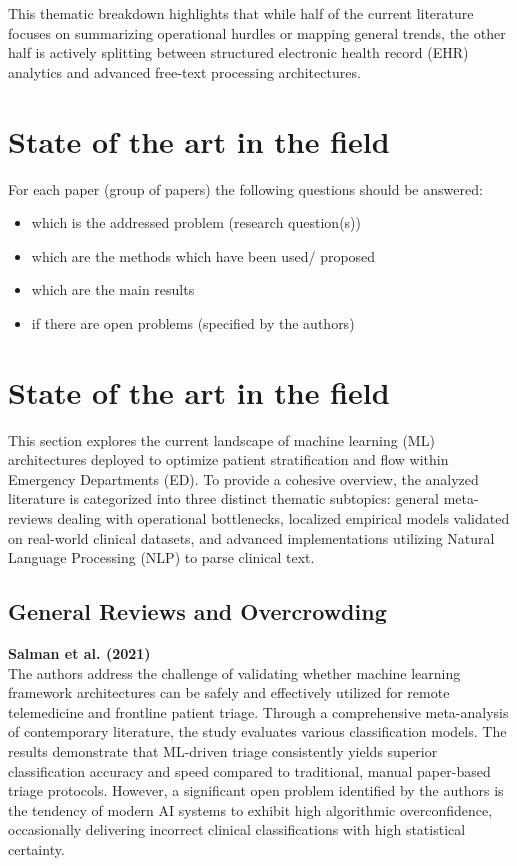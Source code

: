 \documentclass{article}
\begin{document}
This thematic breakdown highlights that while half of the current literature focuses on summarizing operational hurdles or mapping general trends, the other half is actively splitting between structured electronic health record (EHR) analytics and advanced free-text processing architectures.

\section{State of the art in the field}

For each paper (group of papers) the following questions should be answered:
\begin{itemize}
\item which is the addressed problem (research question(s))

\item which are the methods which have been used/ proposed 

\item which are the main results

\item if there are open problems (specified by the authors)
\end{itemize}

\section{State of the art in the field}

This section explores the current landscape of machine learning (ML) architectures deployed to optimize patient stratification and flow within Emergency Departments (ED). To provide a cohesive overview, the analyzed literature is categorized into three distinct thematic subtopics: general meta-reviews dealing with operational bottlenecks, localized empirical models validated on real-world clinical datasets, and advanced implementations utilizing Natural Language Processing (NLP) to parse clinical text.

\subsection{General Reviews and Overcrowding}

\noindent \textbf{Salman et al. (2021) \cite{Salman2021}} \\
The authors address the challenge of validating whether machine learning framework architectures can be safely and effectively utilized for remote telemedicine and frontline patient triage. Through a comprehensive meta-analysis of contemporary literature, the study evaluates various classification models. The results demonstrate that ML-driven triage consistently yields superior classification accuracy and speed compared to traditional, manual paper-based triage protocols. However, a significant open problem identified by the authors is the tendency of modern AI systems to exhibit high algorithmic overconfidence, occasionally delivering incorrect clinical classifications with high statistical certainty.
\end{document}
